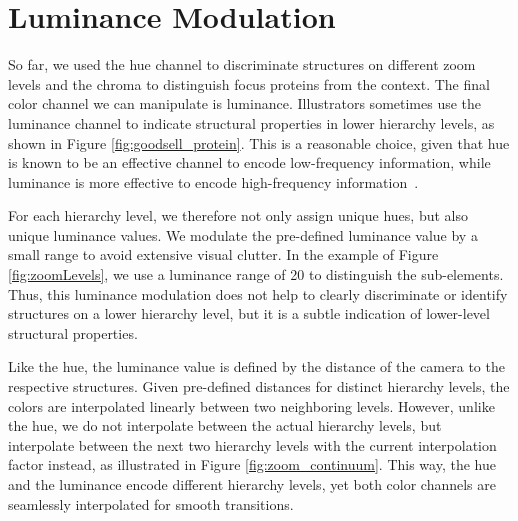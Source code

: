 \documentclass[review,journal]{vgtc}         %
\begin{document}
	
	\section{Luminance Modulation}
	\label{sec:luminance}
	
	So far, we used the hue channel to discriminate structures on different zoom levels and the chroma to distinguish focus proteins from the context. 
	The final color channel we can manipulate is luminance. 
	Illustrators sometimes use the luminance channel to indicate structural properties in lower hierarchy levels, as shown in Figure \ref{fig:goodsell_protein}. 
	This is a reasonable choice, given that hue is known to be an effective channel to encode low-frequency information, while luminance is more effective to encode high-frequency information~\cite{bergman1995rule}. 
	
	
	For each hierarchy level, we therefore not only assign unique hues, but also unique luminance values. 
	We modulate the pre-defined luminance value by a small range to avoid extensive visual clutter. 
	In the example of Figure \ref{fig:zoomLevels}, we use a luminance range of 20 to distinguish the sub-elements. 
	Thus, this luminance modulation does not help to clearly discriminate or identify structures on a lower hierarchy level, but it is a subtle indication of lower-level structural properties. 
	
	Like the hue, the luminance value is defined by the distance of the camera to the respective structures. 
	Given pre-defined distances for distinct hierarchy levels, the colors are interpolated linearly between two neighboring levels. 
	However, unlike the hue, we do not interpolate between the actual hierarchy levels, but interpolate between the next two hierarchy levels with the current interpolation factor instead, as illustrated in Figure \ref{fig:zoom_continuum}. 
	This way, the hue and the luminance encode different hierarchy levels, yet both color channels are seamlessly interpolated for smooth transitions. 
	
	
	
\end{document}
